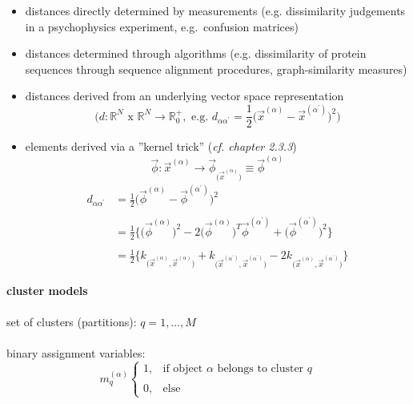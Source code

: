\begin{itemize}
\item distances directly determined by measurements
  (e.g. dissimilarity judgements in a psychophysics experiment, e.g.\
  confusion matrices)
\item distances determined through algorithms (e.g. dissimilarity of
  protein sequences through sequence alignment procedures,
  graph-similarity measures) 
\item distances derived from an underlying vector space representation
  \begin{equation}
    \Big( d: \mathbb{R}^N \text{ x } \mathbb{R}^N 
    \rightarrow \mathbb{R}_0^+, \text{ e.g. }
    d_{\alpha \alpha^{'}} = \frac{1}{2} \big(
    \vec{x}^{(\alpha)} - \vec{x}^{(\alpha^{'})} \big)^2
    \Big)
  \end{equation}
\item elements derived via a ''kernel trick'' ({\it cf. chapter
    2.3.3})
		\begin{equation}
                  \vec{\phi}: \vec{x}^{(\alpha)} \rightarrow
                  \vec{\phi}_{\big( \vec{x}^{(\alpha)} \big)}
                  \equiv \vec{\phi}^{(\alpha)}
		\end{equation}
		\begin{equation}
			\begin{array}{ll}
			d_{\alpha \alpha^{'}} 
			& = \frac{1}{2} \big( \vec{\phi}^{(\alpha)} 
				- \vec{\phi}^{(\alpha^{'})} \big)^2 \\\\
			& = \frac{1}{2} \Big\{ \big( \vec{\phi}^{(\alpha)}
				\big)^2 - 2\big( \vec{\phi}^{(\alpha)} \big)^T
				\vec{\phi}^{(\alpha^{'})} + \big(
				\vec{\phi}^{(\alpha^{'})} \big)^2 \Big\} \\\\
			& = \frac{1}{2} \bigg\{ k_{\big( \vec{x}^{(\alpha)},
				\vec{x}^{(\alpha)} \big)} 
				+ k_{\big(\vec{x}^{(\alpha^{'})},
				\vec{x}^{(\alpha^{'})} \big)}
				- 2k_{\big(\vec{x}^{(\alpha)},
				\vec{x}^{(\alpha^{'})} \big)}
				\bigg\}
			\end{array}
                      \end{equation}
\end{itemize}
{\bf cluster models}
\\\\
set of clusters (partitions): $q = 1, \ldots, M$
\\\\
binary assignment variables:
\begin{equation}
	m_q^{(\alpha)} \left\{ \begin{array}{ll}
		1, & \text{if object } \alpha \text{ belongs to cluster } q \\\\
		0, & \text{else}
	\end{array} \right. 
\end{equation}
